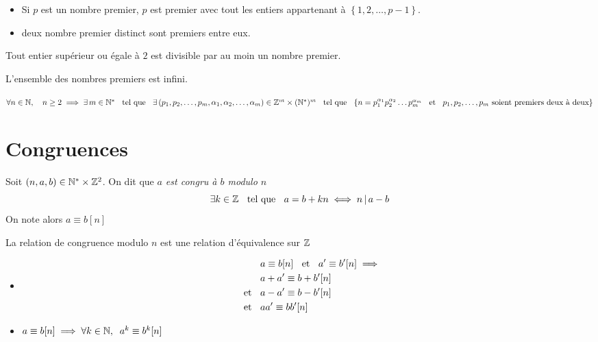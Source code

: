 \begin{cor}
\begin{itemize}
    \item Si $p$ est un nombre premier,
    $p$ est premier avec tout les entiers appartenant à
    $\left\{1, 2, \ldots, p - 1 \right\}$.
    \item deux nombre premier distinct sont premiers entre eux.
\end{itemize}
\end{cor}

\begin{prp}
Tout entier supérieur ou égale à $2$ est divisible par au moin un nombre
premier.
\end{prp}

\begin{cor}
L'ensemble des nombres premiers est infini.
\end{cor}

\begin{thm}
$
            \forall n \in \mathbb{N}, \quad n \geq 2  \\
\implies    \exists \, m \in \mathbb{N}^* \;\;\text{ tel que }\;\; \exists \,
            (p_1, p_2, \ldots, p_m, \alpha_1, \alpha_2, \ldots, \alpha_m) 
    \in \mathbb{Z}^m \times (\mathbb{N}^*)^m \\ 
            \;\;\text{ tel que }\;\;
    \{ n = p_1^{\alpha_1} p_2^{\alpha_2} \ldots p_m^{\alpha_m} 
    \;\;\text{ et }\;\; p_1, p_2, \ldots, p_m \text{ soient premiers deux à deux} \}
$
\end{thm}


\section{Congruences}

\begin{dfn}
Soit $(n, a, b) \in \mathbb{N}^* \times \mathbb{Z}^2$.
On dit que \emph{$a$ est congru à $b$ modulo $n$} \ssi
\[
    \exists k \in \mathbb{Z} \;\;\text{ tel que }\;\; a = b + k n \iff n \operatorname{|} a - b
\]
On note alors $a \equiv b [n]$
\end{dfn}

\begin{prp}
La relation de congruence modulo $n$ est une relation d'équivalence sur $\mathbb{Z}$
\end{prp}

\begin{prp}
\begin{itemize}
    \item 
    \begin{align*}
        &a \equiv b [n] \;\;\text{ et }\;\; a' \equiv b' [n] \implies \\
        &a + a' \equiv b + b' [n] \\
    \;\;\text{ et }\;\; &a - a' \equiv b - b' [n] \\
    \;\;\text{ et }\;\; &a a' \equiv b b' [n]
    \end{align*}
    \item $a \equiv b [n] \implies \forall k \in \mathbb{N}, \;\;
        a^k \equiv b^k [n]$
\end{itemize}
\end{prp}

